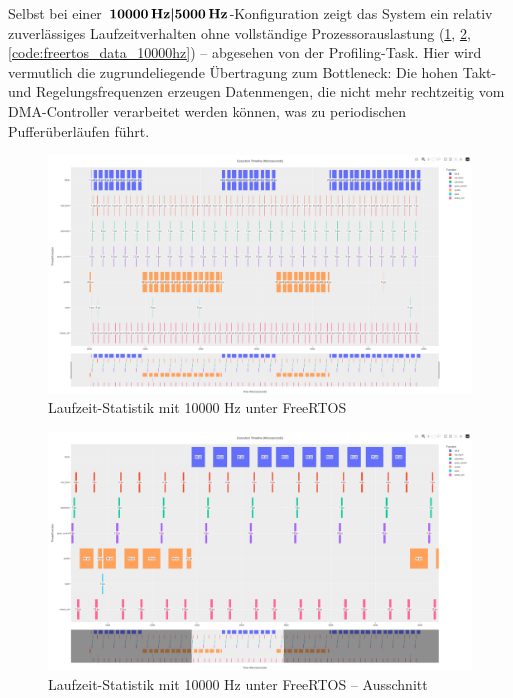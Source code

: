 Selbst bei einer $\textbf{10000\,\text{Hz}|5000\,\text{Hz}}$-Konfiguration zeigt
das System ein relativ zuverlässiges Laufzeitverhalten ohne vollständige
Prozessorauslastung (\ref{fig:freertos_10000hz},
\ref{fig:freertos_10000hz_section}, \ref{code:freertos_data_10000hz}) --
abgesehen von der Profiling-Task. Hier wird vermutlich die zugrundeliegende
Übertragung zum Bottleneck: Die hohen Takt- und Regelungsfrequenzen erzeugen
Datenmengen, die nicht mehr rechtzeitig vom DMA-Controller verarbeitet werden
können, was zu periodischen Pufferüberläufen führt.

\begin{figure}[H]
    \centering
    \includegraphics[width=1\textwidth]{assets/freertos_profiling_10000hz}
    \caption{Laufzeit-Statistik mit 10000 Hz unter FreeRTOS}
    \label{fig:freertos_10000hz}
\end{figure}
\begin{figure}[H]
    \centering
    \includegraphics[width=1\textwidth]{assets/freertos_profiling_10000hz_ausschnitt}
    \caption{Laufzeit-Statistik mit 10000 Hz unter FreeRTOS -- Ausschnitt}
    \label{fig:freertos_10000hz_section}
\end{figure}

